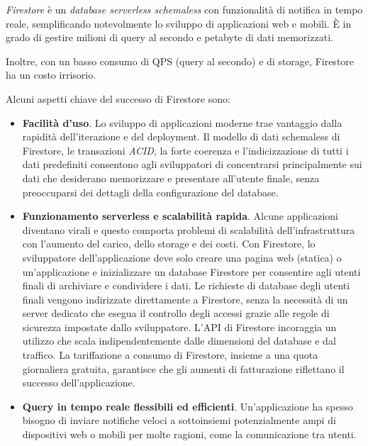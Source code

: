 \textit{Firestore} è un \textit{database serverless schemaless} con funzionalità di notifica in tempo reale, semplificando notevolmente lo sviluppo di applicazioni web e mobili. È in grado di gestire milioni di query al secondo e petabyte di dati memorizzati.

Inoltre, con un basso consumo di QPS (query al secondo) e di storage, Firestore ha un costo irrisorio.

Alcuni aspetti chiave del successo di Firestore sono:
\begin{itemize}
    \item \textbf{Facilità d'uso}. Lo sviluppo di applicazioni moderne trae vantaggio dalla rapidità dell'iterazione e del deployment. Il modello di dati schemaless di Firestore, le transazioni \textit{ACID}, la forte coerenza e l'indicizzazione di tutti i dati predefiniti consentono agli sviluppatori di concentrarsi principalmente sui dati che desiderano memorizzare e presentare all'utente finale, senza preoccuparsi dei dettagli della configurazione del database.
    \item \textbf{Funzionamento serverless e scalabilità rapida}. Alcune applicazioni diventano virali e questo comporta problemi di scalabilità dell'infrastruttura con l'aumento del carico, dello storage e dei costi. Con Firestore, lo sviluppatore dell'applicazione deve solo creare una pagina web (statica) o un'applicazione e inizializzare un database Firestore per consentire agli utenti finali di archiviare e condividere i dati. Le richieste di database degli utenti finali vengono indirizzate direttamente a Firestore, senza la necessità di un server dedicato che esegua il controllo degli accessi grazie alle regole di sicurezza impostate dallo sviluppatore. L'API di Firestore incoraggia un utilizzo che scala indipendentemente dalle dimensioni del database e dal traffico.
    La tariffazione a consumo di Firestore, insieme a una quota giornaliera gratuita, garantisce che gli aumenti di fatturazione riflettano il successo dell'applicazione.
    \item \textbf{Query in tempo reale flessibili ed efficienti}. Un'applicazione ha spesso bisogno di inviare notifiche veloci a sottoinsiemi potenzialmente ampi di dispositivi web o mobili per molte ragioni, come la comunicazione tra utenti.\cite{kesavan2023firestore}
\end{itemize}
